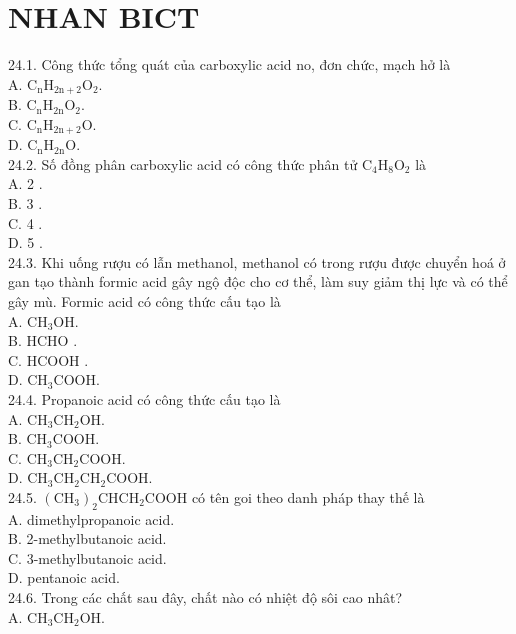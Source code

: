 \documentclass[10pt]{article}
\begin{document}
\section*{NHAN BICT}
24.1. Công thức tổng quát của carboxylic acid no, đơn chức, mạch hở là\\
A. $\mathrm{C}_{\mathrm{n}} \mathrm{H}_{2 \mathrm{n}+2} \mathrm{O}_{2}$.\\
B. $\mathrm{C}_{\mathrm{n}} \mathrm{H}_{2 \mathrm{n}} \mathrm{O}_{2}$.\\
C. $\mathrm{C}_{\mathrm{n}} \mathrm{H}_{2 \mathrm{n}+2} \mathrm{O}$.\\
D. $\mathrm{C}_{\mathrm{n}} \mathrm{H}_{2 \mathrm{n}} \mathrm{O}$.\\
24.2. Số đồng phân carboxylic acid có công thức phân tử $\mathrm{C}_{4} \mathrm{H}_{8} \mathrm{O}_{2}$ là\\
A. 2 .\\
B. 3 .\\
C. 4 .\\
D. 5 .\\
24.3. Khi uống rượu có lẫn methanol, methanol có trong rượu được chuyển hoá ở gan tạo thành formic acid gây ngộ độc cho cơ thể, làm suy giảm thị lực và có thể gây mù. Formic acid có công thức cấu tạo là\\
A. $\mathrm{CH}_{3} \mathrm{OH}$.\\
B. HCHO .\\
C. HCOOH .\\
D. $\mathrm{CH}_{3} \mathrm{COOH}$.\\
24.4. Propanoic acid có công thức cấu tạo là\\
A. $\mathrm{CH}_{3} \mathrm{CH}_{2} \mathrm{OH}$.\\
B. $\mathrm{CH}_{3} \mathrm{COOH}$.\\
C. $\mathrm{CH}_{3} \mathrm{CH}_{2} \mathrm{COOH}$.\\
D. $\mathrm{CH}_{3} \mathrm{CH}_{2} \mathrm{CH}_{2} \mathrm{COOH}$.\\
24.5. $\left(\mathrm{CH}_{3}\right)_{2} \mathrm{CHCH}_{2} \mathrm{COOH}$ có tên goi theo danh pháp thay thế là\\
A. dimethylpropanoic acid.\\
B. 2-methylbutanoic acid.\\
C. 3-methylbutanoic acid.\\
D. pentanoic acid.\\
24.6. Trong các chất sau đây, chất nào có nhiệt độ sôi cao nhât?\\
A. $\mathrm{CH}_{3} \mathrm{CH}_{2} \mathrm{OH}$.\\
\end{document}

